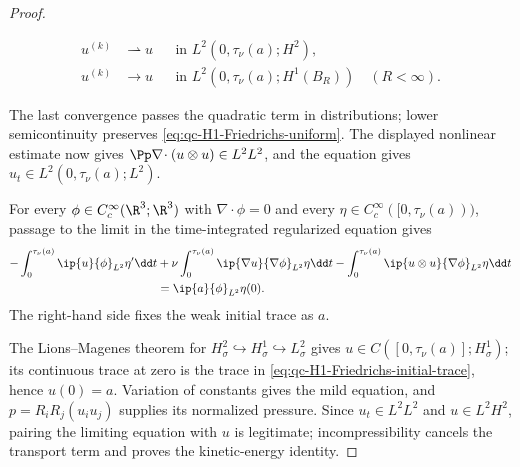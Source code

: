 \begin{proof}
\begin{samepage}
\begin{align*}
 u^{(k)}&\rightharpoonup u
 &&\text{in }L^2(0,\tau_\nu(a);H^2),\\
 u^{(k)}&\longrightarrow u
 &&\text{in }L^2(0,\tau_\nu(a);H^1(B_R))
 \quad(R<\infty).
\end{align*}
\par
\end{samepage}
The last convergence passes the quadratic term in distributions; lower
semicontinuity preserves \eqref{eq:qc-H1-Friedrichs-uniform}.  The displayed
nonlinear estimate now gives
\(\Pp\nabla\!\cdot(u\otimes u)\in L^2L^2\), and the equation gives
\(u_t\in L^2(0,\tau_\nu(a);L^2)\).
\begin{samepage}
For every
\(\phi\in C_c^\infty(\R^3;\R^3)\) with \(\nabla\cdot\phi=0\) and every
\(\eta\in C_c^\infty([0,\tau_\nu(a)))\), passage to the limit in the
time-integrated regularized equation gives
\begin{align}
 -\int_0^{\tau_\nu(a)}\ip{u}{\phi}_{L^2}\eta'\dd t
 &+\nu\int_0^{\tau_\nu(a)}\ip{\nabla u}{\nabla\phi}_{L^2}\eta\dd t
 -\int_0^{\tau_\nu(a)}\ip{u\otimes u}{\nabla\phi}_{L^2}\eta\dd t
 \notag\\
 &=\ip{a}{\phi}_{L^2}\eta(0).
 \label{eq:qc-H1-Friedrichs-initial-trace}
\end{align}
The right-hand side fixes the weak initial trace as \(a\).
\par
\end{samepage}
The Lions--Magenes theorem \cite{LionsMagenes1972} for
\(H^2_\sigma\hookrightarrow H^1_\sigma\hookrightarrow L^2_\sigma\)
gives \(u\in C([0,\tau_\nu(a)];H^1_\sigma)\); its continuous trace at zero is
the trace in \eqref{eq:qc-H1-Friedrichs-initial-trace}, hence \(u(0)=a\).
Variation of constants gives the mild equation, and
\(p=R_iR_j(u_i u_j)\) supplies its normalized pressure.  Since
\(u_t\in L^2L^2\) and \(u\in L^2H^2\), pairing the limiting equation with
\(u\) is legitimate; incompressibility cancels the transport term and proves
the kinetic-energy identity.


\end{proof}
